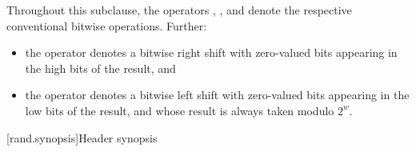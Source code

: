 \pnum
Throughout this subclause,
the operators
\bitand, \bitor, and \xor{}
denote the respective conventional bitwise operations.
Further:

\begin{itemize}
 \item
   the operator \rightshift{} denotes a bitwise right shift
   with zero-valued bits appearing in the high bits of the result, and
 \item
   the operator  denotes a bitwise left shift
   with zero-valued bits appearing in the low bits of the result,
   and whose result is always taken modulo $2^w$.
\end{itemize}




[rand.synopsis]{Header  synopsis}%

